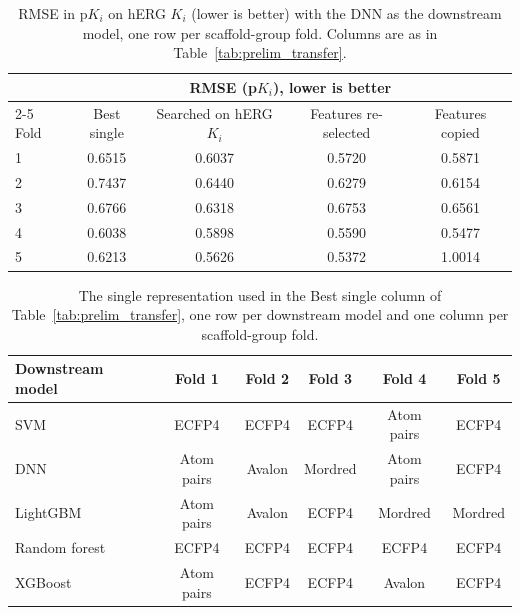 \begin{table}[htbp]
\centering
\small
\begin{tabular}{@{}lcccc@{}}
\toprule
 & \multicolumn{4}{c}{RMSE (p$K_i$), lower is better} \\
\cmidrule(l){2-5}
Fold & Best single & Searched on hERG $K_i$ & Features re-selected & Features copied \\
\midrule
1 & 0.6515 & 0.6037 & 0.5720 & 0.5871 \\
2 & 0.7437 & 0.6440 & 0.6279 & 0.6154 \\
3 & 0.6766 & 0.6318 & 0.6753 & 0.6561 \\
4 & 0.6038 & 0.5898 & 0.5590 & 0.5477 \\
5 & 0.6213 & 0.5626 & 0.5372 & 1.0014 \\
\bottomrule
\end{tabular}
\caption[Reusing LogD settings with the DNN on hERG $K_i$, per fold.]{RMSE in p$K_i$ on hERG $K_i$ (lower is better) with the DNN as the downstream model, one row per scaffold-group fold. Columns are as in Table~\ref{tab:prelim_transfer}.}
\label{tab:prelim_transfer_dnn_folds}
\end{table}

\begin{table}[htbp]
\centering
\small
\begin{tabular}{@{}lccccc@{}}
\toprule
Downstream model & Fold 1 & Fold 2 & Fold 3 & Fold 4 & Fold 5 \\
\midrule
SVM & ECFP4 & ECFP4 & ECFP4 & Atom pairs & ECFP4 \\
DNN & Atom pairs & Avalon & Mordred & Atom pairs & ECFP4 \\
LightGBM & Atom pairs & Avalon & ECFP4 & Mordred & Mordred \\
Random forest & ECFP4 & ECFP4 & ECFP4 & ECFP4 & ECFP4 \\
XGBoost & Atom pairs & ECFP4 & ECFP4 & Avalon & ECFP4 \\
\bottomrule
\end{tabular}
\caption[Best single representation per fold on hERG $K_i$.]{The single representation used in the Best single column of Table~\ref{tab:prelim_transfer}, one row per downstream model and one column per scaffold-group fold.}
\label{tab:prelim_transfer_single}
\end{table}


